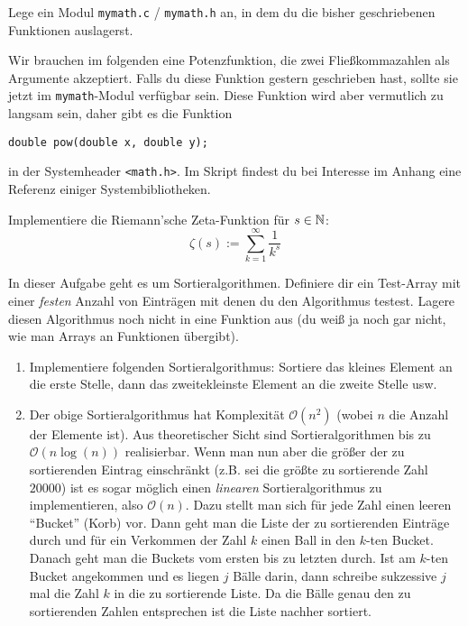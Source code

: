 \documentclass{uebungszettel}
\begin{document}
\begin{aufg} Lege ein Modul \verb|mymath.c| / \verb|mymath.h| an, in dem du die bisher geschriebenen Funktionen auslagerst.
\end{aufg}

Wir brauchen im folgenden eine Potenzfunktion, die zwei Fließkommazahlen als Argumente akzeptiert. Falls du diese Funktion gestern geschrieben hast, sollte sie jetzt im \verb|mymath|-Modul verfügbar sein. Diese Funktion wird aber vermutlich zu langsam sein, daher gibt es die Funktion 

\begin{verbatim}
double pow(double x, double y);
\end{verbatim}

in der Systemheader \verb|<math.h>|. Im Skript findest du bei Interesse im Anhang eine Referenz einiger Systembibliotheken.

\begin{aufg}
Implementiere die Riemann'sche Zeta-Funktion für $s \in \mathbb{N}$: $$
\zeta(s) := \sum_{k=1}^\infty \frac{1}{k^s} $$
\end{aufg}

\begin{aufg} In dieser Aufgabe geht es um Sortieralgorithmen. Definiere dir ein Test-Array mit einer \emph{festen} Anzahl von Einträgen mit denen du den Algorithmus testest. Lagere diesen Algorithmus noch nicht in eine Funktion aus (du weiß ja noch gar nicht, wie man Arrays an Funktionen übergibt).
\begin{enumerate} 
\item Implementiere folgenden Sortieralgorithmus: Sortiere das kleines Element an die erste Stelle, dann das zweitekleinste Element an die zweite Stelle usw.
\item Der obige Sortieralgorithmus hat Komplexität $\mathcal O(n^2)$ (wobei $n$ die Anzahl der Elemente ist). Aus theoretischer Sicht sind Sortieralgorithmen bis zu $\mathcal O(n \log(n))$ realisierbar. Wenn man nun aber die größer der zu sortierenden Eintrag einschränkt (z.B. sei die größte zu sortierende Zahl $20000$) ist es sogar möglich einen \emph{linearen} Sortieralgorithmus zu implementieren, also $\mathcal O(n)$. Dazu stellt man sich für jede Zahl einen leeren ``Bucket'' (Korb) vor. Dann geht man die Liste der zu sortierenden Einträge durch und für ein Verkommen der Zahl $k$ einen Ball in den $k$-ten Bucket. Danach geht man die Buckets vom ersten bis zu letzten durch. Ist am $k$-ten Bucket angekommen und es liegen $j$ Bälle darin, dann schreibe sukzessive $j$ mal die Zahl $k$ in die zu sortierende Liste. Da die Bälle genau den zu sortierenden Zahlen entsprechen ist die Liste nachher sortiert. 
\end{enumerate}
\end{aufg}
\end{document}
